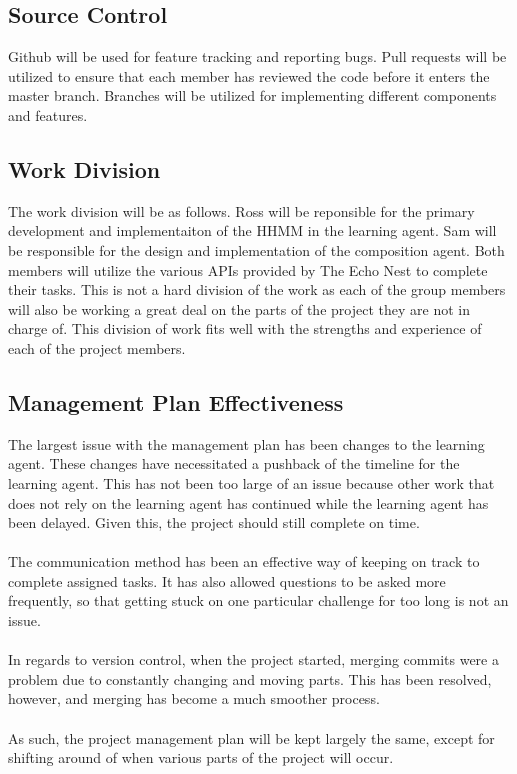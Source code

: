 \documentclass{article}
\begin{document}
\subsection{Source Control}
Github will be used for feature tracking and reporting bugs.  Pull requests will be utilized to 
ensure that each member has reviewed the code before it enters the master branch.  Branches will 
be utilized for implementing different components and features.

\subsection{Work Division}
The work division will be as follows. Ross will be reponsible for the primary development and 
implementaiton of the HHMM in the learning agent. Sam will be responsible for the design and 
implementation of the composition agent. Both members will utilize the various APIs provided by
The Echo Nest to complete their tasks.  This is not a hard division of the work as each of 
the group members will also be working a great deal on the parts of the project they are not in
charge of. This division of work fits well with the strengths and experience of each of the 
project members.

\subsection{Management Plan Effectiveness}
The largest issue with the management plan has been changes to the learning agent. These changes have necessitated a pushback of the timeline for the learning agent. This has not been too large of an issue because other work that does not rely on the learning agent has continued while the learning agent has been delayed. Given this, the project should still complete on time.\\
\\
The communication method has been an effective way of keeping on track to complete assigned tasks.  It has also allowed questions to be asked more frequently, so that getting stuck on one particular challenge for too long is not an issue.\\
\\
In regards to version control, when the project started, merging commits were a problem due to constantly changing and moving parts. This has been resolved, however, and merging has become a much smoother process.\\
\\
As such, the project management plan will be kept largely the same, except for shifting around of when various parts of the project will occur.
\end{document}
